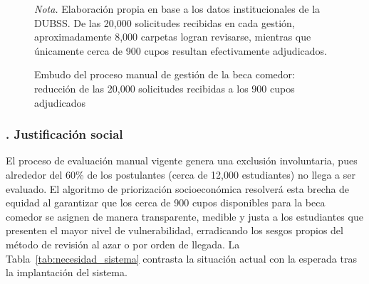 \begin{figure}[htbp]
\caption{Embudo del proceso manual de gestión de la beca comedor: reducción de las 20,000 solicitudes recibidas a los 900 cupos adjudicados}
\label{fig:cuello_botella}
\centering
{}

\smallskip
\noindent\raggedright\textit{Nota.} Elaboración propia en base a los datos institucionales de la DUBSS. De las 20,000 solicitudes recibidas en cada gestión, aproximadamente 8,000 carpetas logran revisarse, mientras que únicamente cerca de 900 cupos resultan efectivamente adjudicados.
\end{figure}

\subsubsection{. Justificación social}\label{sec:justificacion_social}

El proceso de evaluación manual vigente genera una exclusión involuntaria, pues alrededor del 60\% de los postulantes (cerca de 12,000 estudiantes) no llega a ser evaluado. El algoritmo de priorización socioeconómica resolverá esta brecha de equidad al garantizar que los cerca de 900 cupos disponibles para la beca comedor se asignen de manera transparente, medible y justa a los estudiantes que presenten el mayor nivel de vulnerabilidad, erradicando los sesgos propios del método de revisión al azar o por orden de llegada. La Tabla~\ref{tab:necesidad_sistema} contrasta la situación actual con la esperada tras la implantación del sistema.

